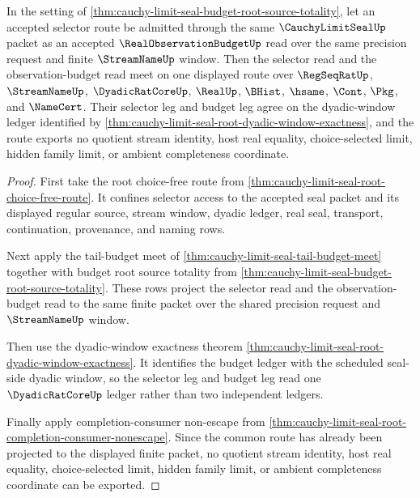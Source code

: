 \begin{theorem}
\label{thm:cauchy-limit-seal-budget-selector-coherence}
In the setting of \autoref{thm:cauchy-limit-seal-budget-root-source-totality}, let an accepted selector route be admitted through the same $\CauchyLimitSealUp$ packet as an accepted $\RealObservationBudgetUp$ read over the same precision request and finite $\StreamNameUp$ window. Then the selector read and the observation-budget read meet on one displayed route over $\RegSeqRatUp$, $\StreamNameUp$, $\DyadicRatCoreUp$, $\RealUp$, $\BHist$, $\hsame$, $\Cont$, $\Pkg$, and $\NameCert$. Their selector leg and budget leg agree on the dyadic-window ledger identified by \autoref{thm:cauchy-limit-seal-root-dyadic-window-exactness}, and the route exports no quotient stream identity, host real equality, choice-selected limit, hidden family limit, or ambient completeness coordinate.
\end{theorem}
\begin{proof}
First take the root choice-free route from \autoref{thm:cauchy-limit-seal-root-choice-free-route}. It confines selector access to the accepted seal packet and its displayed regular source, stream window, dyadic ledger, real seal, transport, continuation, provenance, and naming rows.

Next apply the tail-budget meet of \autoref{thm:cauchy-limit-seal-tail-budget-meet} together with budget root source totality from \autoref{thm:cauchy-limit-seal-budget-root-source-totality}. These rows project the selector read and the observation-budget read to the same finite packet over the shared precision request and $\StreamNameUp$ window.

Then use the dyadic-window exactness theorem \autoref{thm:cauchy-limit-seal-root-dyadic-window-exactness}. It identifies the budget ledger with the scheduled seal-side dyadic window, so the selector leg and budget leg read one $\DyadicRatCoreUp$ ledger rather than two independent ledgers.

Finally apply completion-consumer non-escape from \autoref{thm:cauchy-limit-seal-root-completion-consumer-nonescape}. Since the common route has already been projected to the displayed finite packet, no quotient stream identity, host real equality, choice-selected limit, hidden family limit, or ambient completeness coordinate can be exported.
\end{proof}

